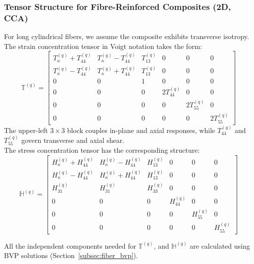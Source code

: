 \documentclass[oneside, 12pt, a4paper, bibliography=totoc]{book}
\begin{document}
\subsubsection{Tensor Structure for Fibre-Reinforced Composites (2D, CCA)}
\label{subsec:tensor_structure_fiber}

For long cylindrical fibers, we assume the composite exhibits transverse isotropy. The strain concentration tensor in Voigt notation takes the form:
%
\begin{equation}
    \mathbb{T}^{(q)} =
    \begin{bmatrix}
        T_{\kappa}^{(q)} + T_{44}^{(q)} & T_{\kappa}^{(q)} - T_{44}^{(q)} & T_{13}^{(q)} & 0 & 0 & 0 \\[4pt]
        T_{\kappa}^{(q)} - T_{44}^{(q)} & T_{\kappa}^{(q)} + T_{44}^{(q)} & T_{13}^{(q)} & 0 & 0 & 0 \\[4pt]
        0 & 0 & 1 & 0 & 0 & 0 \\[4pt]
        0 & 0 & 0 & 2T_{44}^{(q)} & 0 & 0 \\[4pt]
        0 & 0 & 0 & 0 & 2T_{55}^{(q)} & 0 \\[4pt]
        0 & 0 & 0 & 0 & 0 & 2T_{55}^{(q)}
    \end{bmatrix}
    \label{eq:T_fiber_structure}
\end{equation}
%
The upper-left $3 \times 3$ block couples in-plane and axial responses, while $T_{44}^{(q)}$ and $T_{55}^{(q)}$ govern transverse and axial shear. \\The stress concentration tensor has the corresponding structure:
%
\begin{equation}
    \mathbb{H}^{(q)} =
    \begin{bmatrix}
        H_{\kappa}^{(q)} + H_{44}^{(q)} & H_{\kappa}^{(q)} - H_{44}^{(q)} & H_{13}^{(q)} & 0 & 0 & 0 \\[4pt]
        H_{\kappa}^{(q)} - H_{44}^{(q)} & H_{\kappa}^{(q)} + H_{44}^{(q)} & H_{13}^{(q)} & 0 & 0 & 0 \\[4pt]
        H_{31}^{(q)} & H_{31}^{(q)} & H_{33}^{(q)} & 0 & 0 & 0 \\[4pt]
        0 & 0 & 0 & H_{44}^{(q)} & 0 & 0 \\[4pt]
        0 & 0 & 0 & 0 & H_{55}^{(q)} & 0 \\[4pt]
        0 & 0 & 0 & 0 & 0 & H_{55}^{(q)}
    \end{bmatrix}
    \label{eq:H_fiber_structure}
\end{equation}

All the independent components needed for $\mathbb{T}^{(q)}$, and $\mathbb{H}^{(q)}$ are calculated using BVP solutions (Section~\ref{subsec:fiber_bvp}).
\end{document}
